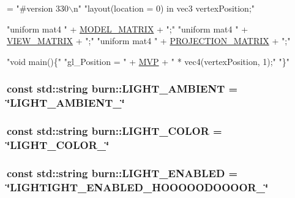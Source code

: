 \begin{DoxyCode}
= \textcolor{stringliteral}{"#version 330\(\backslash\)n"}
        \textcolor{stringliteral}{"layout(location = 0) in vec3 vertexPosition;"}

        \textcolor{stringliteral}{"uniform mat4 "} + \hyperlink{namespaceburn_aef2bc91c4c84fa143da611ee2f284c8b}{MODEL\_MATRIX} + \textcolor{stringliteral}{";"}
        \textcolor{stringliteral}{"uniform mat4 "} + \hyperlink{namespaceburn_a7cb7c6572d4f7796ea3e5edae85e51f1}{VIEW\_MATRIX} + \textcolor{stringliteral}{";"}
        \textcolor{stringliteral}{"uniform mat4 "} + \hyperlink{namespaceburn_ae5e90743826abef0fbc9d54704ae2a6f}{PROJECTION\_MATRIX} + \textcolor{stringliteral}{";"}

        \textcolor{stringliteral}{"void main()\{"}
            \textcolor{stringliteral}{"gl\_Position = "} + \hyperlink{namespaceburn_a7c71b053f299e14c880f0f11ba916a44}{MVP} + \textcolor{stringliteral}{" * vec4(vertexPosition, 1);"}
        \textcolor{stringliteral}{"\}"}
\end{DoxyCode}
\hypertarget{namespaceburn_a1f547dd93c8820ec1276db0869c7e92c}{
\subsubsection[{L\-I\-G\-H\-T\-\_\-\-A\-M\-B\-I\-E\-N\-T}]{\setlength{\rightskip}{0pt plus 5cm}const std\-::string burn\-::\-L\-I\-G\-H\-T\-\_\-\-A\-M\-B\-I\-E\-N\-T = \char`\"{}L\-I\-G\-H\-T\-\_\-\-A\-M\-B\-I\-E\-N\-T\-\_\-\char`\"{}}}\label{namespaceburn_a1f547dd93c8820ec1276db0869c7e92c}
\hypertarget{namespaceburn_ad5901e3871a98659781464fbbcd2e37c}{
\subsubsection[{L\-I\-G\-H\-T\-\_\-\-C\-O\-L\-O\-R}]{\setlength{\rightskip}{0pt plus 5cm}const std\-::string burn\-::\-L\-I\-G\-H\-T\-\_\-\-C\-O\-L\-O\-R = \char`\"{}L\-I\-G\-H\-T\-\_\-\-C\-O\-L\-O\-R\-\_\-\char`\"{}}}\label{namespaceburn_ad5901e3871a98659781464fbbcd2e37c}
\hypertarget{namespaceburn_a2761e037b3be5b8f6f125f294a44b0bf}{
\subsubsection[{L\-I\-G\-H\-T\-\_\-\-E\-N\-A\-B\-L\-E\-D}]{\setlength{\rightskip}{0pt plus 5cm}const std\-::string burn\-::\-L\-I\-G\-H\-T\-\_\-\-E\-N\-A\-B\-L\-E\-D = \char`\"{}L\-I\-G\-H\-T\-I\-G\-H\-T\-\_\-\-E\-N\-A\-B\-L\-E\-D\-\_\-\-H\-O\-O\-O\-O\-O\-D\-O\-O\-O\-O\-R\-\_\-\char`\"{}}}\label{namespaceburn_a2761e037b3be5b8f6f125f294a44b0bf}
